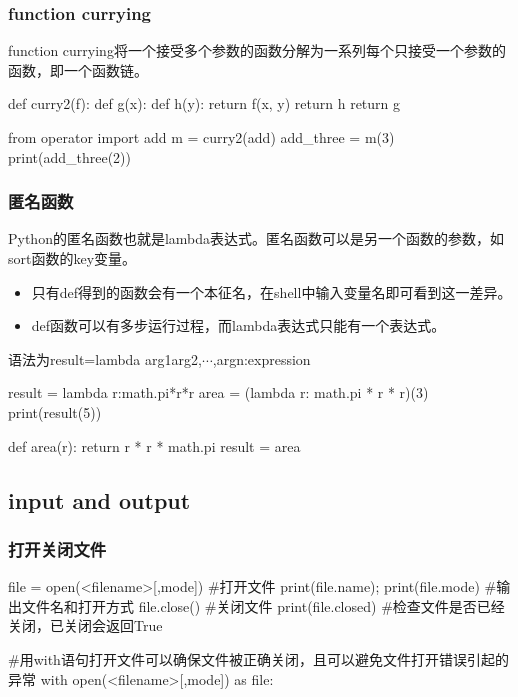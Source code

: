     \subsubsection{function currying}
      function currying将一个接受多个参数的函数分解为一系列每个只接受一个参数的函数，即一个函数链。
      \begin{codeblock}[language=python, caption={function currying}]
        def curry2(f):
          def g(x):
            def h(y):
              return f(x, y)
            return h
          return g
          
        from operator import add
        m = curry2(add)
        add_three = m(3)
        print(add_three(2))
      \end{codeblock}
  
    \subsubsection{匿名函数}
      Python的匿名函数也就是lambda表达式。匿名函数可以是另一个函数的参数，如sort函数的key变量。

      \begin{itemize}
        \item 只有def得到的函数会有一个本征名，在shell中输入变量名即可看到这一差异。
        \item def函数可以有多步运行过程，而lambda表达式只能有一个表达式。
      \end{itemize}

      语法为result=lambda \lbrack arg1\lbrack arg2,$\cdots$,argn\rbrack \rbrack:expression
      \begin{codeblock}[language=python, caption={lambda function}]
        result = lambda r:math.pi*r*r
        area = (lambda r: math.pi * r * r)(3)
        print(result(5))

        def area(r):
          return r * r * math.pi
        result = area
      \end{codeblock}

  \subsection{input and output}
    \subsubsection{打开关闭文件}
      \begin{codeblock}[language=python, caption={open and close files}]
        file = open(<filename>[,mode]) #打开文件
        print(file.name); print(file.mode) #输出文件名和打开方式
        file.close() #关闭文件
        print(file.closed) #检查文件是否已经关闭，已关闭会返回True

        #用with语句打开文件可以确保文件被正确关闭，且可以避免文件打开错误引起的异常
        with open(<filename>[,mode]) as file:
      \end{codeblock}

